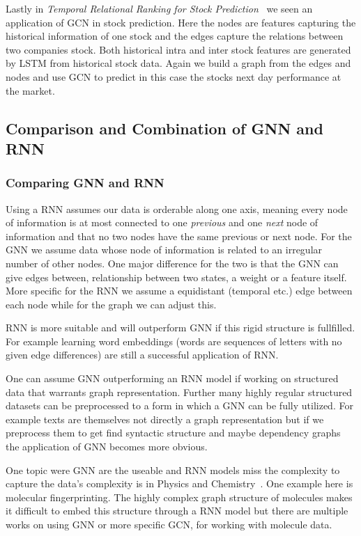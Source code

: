 \documentclass{article}
\begin{document}
Lastly in \textit{Temporal Relational Ranking for Stock Prediction}~\cite{feng2019} we seen an application of GCN in stock prediction.
Here the nodes are features capturing the historical information of one stock and the edges capture the relations between two companies stock.
Both historical intra and inter stock features are generated by LSTM from historical stock data.
Again we build a graph from the edges and nodes and use GCN to predict in this case the stocks next day performance at the market.

\subsection{Comparison and Combination of GNN and RNN}
\subsubsection{Comparing GNN and RNN}
Using a RNN assumes our data is orderable along one axis, meaning every node of information is at most connected to one \textit{previous} and one \textit{next} node of information and that no two nodes have the same previous or next node.
For the GNN we assume data whose node of information is related to an irregular number of other nodes. One major difference for the two is that the GNN can give edges between, relationship between two states, a weight or a feature itself. More specific for the RNN we assume a equidistant (temporal etc.) edge between each node while for the graph we can adjust this.

RNN is more suitable and will outperform GNN if this rigid structure is fullfilled. For example learning word embeddings (words are sequences of letters with no given edge differences) are still a successful application of RNN.

One can assume GNN outperforming an RNN model if working on structured data that warrants graph representation.
Further many highly regular structured datasets can be preprocessed to a form in which a GNN can be fully utilized.
For example texts are themselves not directly a graph representation but if we preprocess them to get find syntactic structure and maybe dependency graphs the application of GNN becomes more obvious.

One topic were GNN are the useable and RNN models miss the complexity to capture the data's complexity is in Physics and Chemistry~\cite{zhou2018}.
One example here is molecular fingerprinting.
The highly complex graph structure of molecules makes it difficult to embed this structure through a RNN model but there are multiple works on using GNN or more specific GCN, for working with molecule data.
\end{document}
